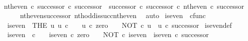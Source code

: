 \begin{isabellebody}
\ \ \isamarkupfalse%
\ \isamarkupfalse%
\ {\isachardoublequoteopen}{\isacharparenleft}{\kern0pt}nth{\isacharunderscore}{\kern0pt}even\ {\isasymcirc}\isactrlsub c\ successor{\isacharparenright}{\kern0pt}\ {\isasymcirc}\isactrlsub c\ successor\ {\isacharequal}{\kern0pt}\ {\isacharparenleft}{\kern0pt}successor\ {\isasymcirc}\isactrlsub c\ successor{\isacharparenright}{\kern0pt}\ {\isasymcirc}\isactrlsub c\ nth{\isacharunderscore}{\kern0pt}even\ {\isasymcirc}\isactrlsub c\ successor{\isachardoublequoteclose}\isanewline
\ \ \ \ \isamarkupfalse%
\ nth{\isacharunderscore}{\kern0pt}even{\isacharunderscore}{\kern0pt}successor{}\ nth{\isacharunderscore}{\kern0pt}odd{\isacharunderscore}{\kern0pt}is{\isacharunderscore}{\kern0pt}succ{\isacharunderscore}{\kern0pt}nth{\isacharunderscore}{\kern0pt}even\ \isamarkupfalse%
\ auto\isanewline
{}\isamarkupfalse%
%
\endisatagproof
{\isafoldproof}%
%
\isadelimproof
%
\endisadelimproof
%
\isadelimdocument
%
\endisadelimdocument
%
\isatagdocument
%
\isamarkuptrue%
%
\endisatagdocument
{\isafolddocument}%
%
\isadelimdocument
%
\endisadelimdocument
{}\isamarkupfalse%
\ is{\isacharunderscore}{\kern0pt}even\ {\isacharcolon}{\kern0pt}{\isacharcolon}{\kern0pt}\ {\isachardoublequoteopen}cfunc{\isachardoublequoteclose}\ \isanewline
\ \ {\isachardoublequoteopen}is{\isacharunderscore}{\kern0pt}even\ {\isacharequal}{\kern0pt}\ {\isacharparenleft}{\kern0pt}THE\ u{\isachardot}{\kern0pt}\ u{\isacharcolon}{\kern0pt}\ {\isasymnat}\isactrlsub c\ {\isasymrightarrow}\ {\isasymOmega}\ {\isasymand}\ u\ {\isasymcirc}\isactrlsub c\ zero\ {\isacharequal}{\kern0pt}\ {\isasymt}\ {\isasymand}\ NOT\ {\isasymcirc}\isactrlsub c\ u\ {\isacharequal}{\kern0pt}\ u\ {\isasymcirc}\isactrlsub c\ successor{\isacharparenright}{\kern0pt}{\isachardoublequoteclose}\isanewline
\isanewline
{}\isamarkupfalse%
\ is{\isacharunderscore}{\kern0pt}even{\isacharunderscore}{\kern0pt}def{}{\isacharcolon}{\kern0pt}\isanewline
\ \ {\isachardoublequoteopen}is{\isacharunderscore}{\kern0pt}even\ {\isacharcolon}{\kern0pt}\ {\isasymnat}\isactrlsub c\ {\isasymrightarrow}\ {\isasymOmega}\ {\isasymand}\ is{\isacharunderscore}{\kern0pt}even\ {\isasymcirc}\isactrlsub c\ zero\ {\isacharequal}{\kern0pt}\ {\isasymt}\ {\isasymand}\ NOT\ {\isasymcirc}\isactrlsub c\ is{\isacharunderscore}{\kern0pt}even\ {\isacharequal}{\kern0pt}\ is{\isacharunderscore}{\kern0pt}even\ {\isasymcirc}\isactrlsub c\ successor{\isachardoublequoteclose}\isanewline

\end{isabellebody}

